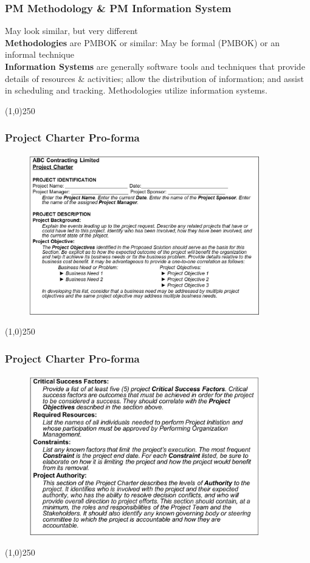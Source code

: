 \begin{frame}
\frametitle{PM Methodology \& PM Information System}
May look similar, but very different\\
\textbf{Methodologies} are PMBOK or similar: May be formal (PMBOK) or an informal technique\\
\textbf{Information Systems} are generally software tools and techniques that provide details of resources \& activities; allow the distribution of information; and assist in scheduling and tracking.  Methodologies utilize information systems.
\end{frame}\begin{center}\line(1,0){250}\end{center}
%
%

\begin{frame}
\frametitle{Project Charter Pro-forma}

\begin{figure}
	\centering
		\includegraphics[width = 10cm]{images/charter1.jpg}
	\label{fig:charter1}
\end{figure} 
\end{frame}\begin{center}\line(1,0){250}\end{center}
%
%


\begin{frame}
\frametitle{Project Charter Pro-forma}
%
%
\begin{figure}
	\centering
		\includegraphics[width = 10cm]{images/charter2.jpg}
	\label{fig:charter2}
\end{figure} 
\end{frame}\begin{center}\line(1,0){250}\end{center}
%
%


